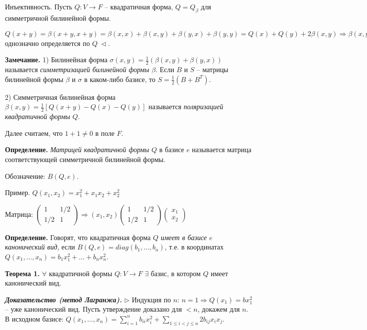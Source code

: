 Инъективность. Пусть $Q:V \rightarrow F$ -- квадратичная форма, $Q = Q_\beta$ для симметричной билинейной формы.

$Q(x+y) = \beta(x+y, x+y) = \beta(x,x) + \beta(x,y) + \beta(y,x) + \beta(y,y) = Q(x) + Q(y) + 2\beta(x, y) \Rightarrow \beta(x,y) = \frac{1}{2} \left[ Q(x+y) - Q(x) - Q(y) \right] \Rightarrow \beta$ однозначно определяется по $Q \ \lhd$.

\bigskip
\textbf{Замечание.} 1) Билинейная форма $\sigma(x,y) = \frac{1}{2} (\beta(x,y) + \beta(y,x))$ называется \textit{симметризацией билинейной формы} $\beta$. Если $B$ и $S$ -- матрицы билинейной формы $\beta$ и $\sigma$ в каком-либо базисе, то $S = \frac{1}{2} (B + B^T)$.

2) Симметричная билинейная форма $\beta(x,y) = \frac{1}{2} \left[ Q(x+y) - Q(x) - Q(y) \right]$ называется \textit{поляризацией квадратичной формы} $Q$. 

\bigskip
Далее считаем, что $1+1 \neq 0$ в поле $F$.

\bigskip
\textbf{Определение.} \textit{Матрицей квадратичной формы} $Q$ в базисе $e$ называется матрица соответствующей симметричной билинейной формы.

Обозначение: $B (Q, e)$.

\bigskip
Пример. $Q(x_1, x_2) = x_1^2 + x_1 x_2 + x_2^2$

Матрица: $\begin{pmatrix} 1 & 1/2 \\ 1/2 & 1 \end{pmatrix} \Rightarrow (x_1, x_2) \begin{pmatrix} 1 & 1/2 \\ 1/2 & 1 \end{pmatrix} \begin{pmatrix} x_1 \\ x_2 \end{pmatrix} $

\bigskip
\textbf{Определение.} Говорят, что квадратичная форма $Q$ \textit{имеет в базисе $e$ канонический вид}, если $B(Q, e) = diag(b_1,\dots, b_n)$, т.е. в координатах $Q(x_1, \dots, x_n) = b_1 x_1^2 + \dots + b_n x_n^2$.

\bigskip
\textbf{Теорема 1.} $\forall$ квадратичной формы $Q: V \rightarrow F$ $\exists$ базис,  в котором $Q$ имеет канонический вид.

\bigskip
\textbf{\textit{Доказательство (метод Лагранжа).}} $\rhd$ Индукция по $n$: $n=1 \Rightarrow Q(x_1) = b x_1^2$ -- уже канонический вид. Пусть утверждение доказано для $<n$, докажем для $n$. В исходном базисе: $Q(x_1, \dots, x_n) = \sum\limits_{i=1}^n b_{ii} x_i^2 + \sum\limits_{1 \leq i < j \leq n} 2b_{ij} x_i x_j$.

